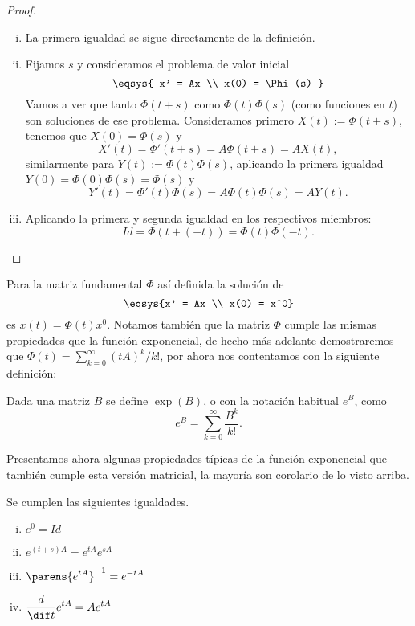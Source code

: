 \documentclass[../main.tex]{subfiles}
\begin{document}
\begin{proof}
	\begin{enumerate}[i), wide, labelwidth=0pt, labelindent=0pt]
		\item La primera igualdad se sigue directamente de la definición.
		\item Fijamos \(s\) y consideramos el problema de valor inicial
			\[\eqsys{ x' = Ax \\ x(0) = \Phi(s) }\]
			Vamos a ver que tanto \(\Phi(t + s)\) como \(\Phi(t)\Phi(s)\) (como
			funciones en \(t\)) son soluciones de ese problema. Consideramos
			primero \(X(t) := \Phi(t + s)\), tenemos que \(X(0) = \Phi(s)\) y
			\[X'(t) = \Phi'(t + s) = A \Phi(t + s) = A X(t),\]
			similarmente para \(Y(t) := \Phi(t)\Phi(s)\), aplicando la primera 
			igualdad \(Y(0) = \Phi(0)\Phi(s) = \Phi(s)\) y
			\[Y'(t) = \Phi'(t)\Phi(s) = A \Phi(t)\Phi(s) = A Y(t).\]
		\item Aplicando la primera y segunda igualdad en los respectivos
			miembros:
			\[\mathit{Id} = \Phi(t + (-t)) = \Phi(t)\Phi(-t).\]
	\end{enumerate}
\end{proof}

Para la matriz fundamental \(\Phi\) así definida la solución de
\[\eqsys{x' = Ax \\ x(0) = x^0}\]
es \(x(t) = \Phi(t)x^0\). Notamos también que la matriz \(\Phi\) cumple las
mismas propiedades que la función exponencial, de hecho más adelante
demostraremos que \(\Phi(t) = \sum_{k=0}^\infty (tA)^k/k!\), por ahora nos
contentamos con la siguiente definición:

\begin{definition}
	Dada una matriz \(B\) se define \(\exp(B)\), o con la notación habitual
	\(e^B\), como
	\[e^B = \sum_{k = 0}^\infty \frac{B^k}{k!}.\]
\end{definition}

Presentamos ahora algunas propiedades típicas de la función exponencial que
también cumple esta versión matricial, la mayoría son corolario de lo visto 
arriba.

\begin{proposition}
	Se cumplen las siguientes igualdades.
	\begin{multicols}{2}
	\begin{enumerate}[i)]
		\item \(\displaystyle e^0 = \mathit{Id}\) 
		\item \(\displaystyle e^{(t + s)A} = e^{tA} e^{sA}\) 
		\item \(\displaystyle \parens{e^{tA}}^{-1} = e^{-tA}\) 
		\item \(\displaystyle \frac{d}{\dif t} e^{tA} = A e^{tA}\)
	\end{enumerate}
	\end{multicols}
\end{proposition}
\end{document}
